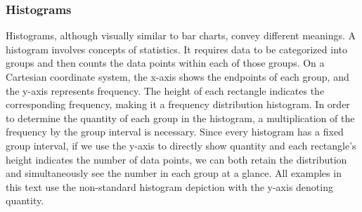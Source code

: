 \documentclass{article}\usepackage[]{graphicx}\usepackage[]{xcolor}
\begin{document}
\subsubsection{Histograms}
Histograms, although visually similar to bar charts, convey different meanings. A histogram involves concepts of statistics. It requires data to be categorized into groups and then counts the data points within each of those groups. On a Cartesian coordinate system, the x-axis shows the endpoints of each group, and the y-axis represents frequency. The height of each rectangle indicates the corresponding frequency, making it a frequency distribution histogram. In order to determine the quantity of each group in the histogram, a multiplication of the frequency by the group interval is necessary. Since every histogram has a fixed group interval, if we use the y-axis to directly show quantity and each rectangle's height indicates the number of data points, we can both retain the distribution and simultaneously see the number in each group at a glance. All examples in this text use the non-standard histogram depiction with the y-axis denoting quantity.
\end{document}
